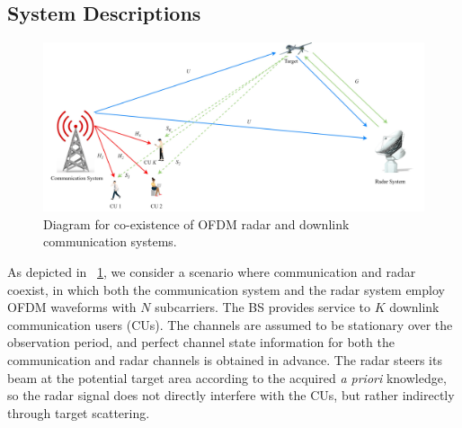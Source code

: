 \documentclass[a4paper,journal,10pt]{IEEEtran}
\begin{document}
\subsection{System Descriptions}
\begin{figure}[htbp]
	\centering
	\includegraphics[width=\columnwidth]{Figure/Sharing.jpg}%
	\caption{Diagram for co-existence of OFDM radar and downlink communication systems.}
	\label{fig-1}
\end{figure}
As depicted in \figurename~\ref{fig-1}, we consider a scenario where communication and radar coexist, in which both the communication system and the radar system employ OFDM waveforms with $N$ subcarriers. The BS provides service to $K$ downlink communication users (CUs).
The channels are assumed to be stationary over the observation period, and perfect channel state information for both the communication and radar channels is obtained in advance. The radar steers its beam at the potential target area according to the acquired \textit{a priori} knowledge, so the radar signal does not directly interfere with the CUs, but rather indirectly through target scattering.
\end{document}
